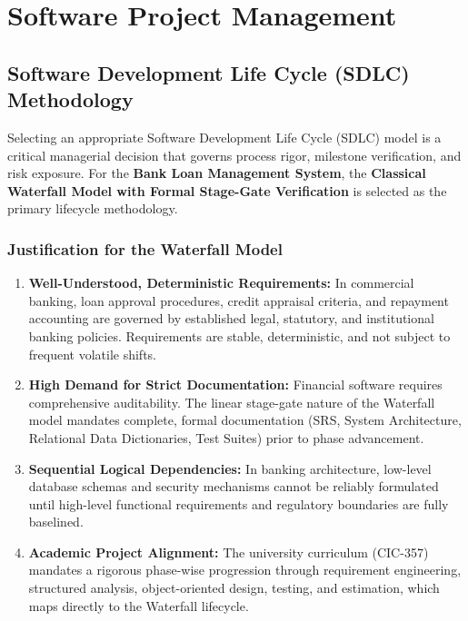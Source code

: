 \chapter{Software Project Management}

\section{Software Development Life Cycle (SDLC) Methodology}

Selecting an appropriate Software Development Life Cycle (SDLC) model is a critical managerial decision that governs process rigor, milestone verification, and risk exposure. For the \textbf{Bank Loan Management System}, the \textbf{Classical Waterfall Model with Formal Stage-Gate Verification} is selected as the primary lifecycle methodology.

\subsection{Justification for the Waterfall Model}

\begin{enumerate}
  \item \textbf{Well-Understood, Deterministic Requirements:} In commercial banking, loan approval procedures, credit appraisal criteria, and repayment accounting are governed by established legal, statutory, and institutional banking policies. Requirements are stable, deterministic, and not subject to frequent volatile shifts.
  \item \textbf{High Demand for Strict Documentation:} Financial software requires comprehensive auditability. The linear stage-gate nature of the Waterfall model mandates complete, formal documentation (SRS, System Architecture, Relational Data Dictionaries, Test Suites) prior to phase advancement.
  \item \textbf{Sequential Logical Dependencies:} In banking architecture, low-level database schemas and security mechanisms cannot be reliably formulated until high-level functional requirements and regulatory boundaries are fully baselined.
  \item \textbf{Academic Project Alignment:} The university curriculum (CIC-357) mandates a rigorous phase-wise progression through requirement engineering, structured analysis, object-oriented design, testing, and estimation, which maps directly to the Waterfall lifecycle.
\end{enumerate}

